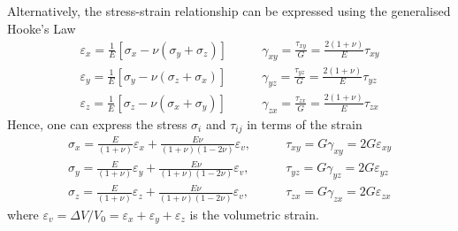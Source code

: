 \documentclass[12pt, a4paper]{article}
\numberwithin{equation}{section}
\begin{document}
Alternatively, the stress-strain relationship can be expressed using the generalised Hooke's Law
\begin{align}
    \varepsilon_x = \frac{1}{E} \left[ \sigma_x - \nu(\sigma_y + \sigma_z) \right]
    \quad & \quad
    \gamma_{xy} = \frac{\tau_{xy}}{G} = \frac{2(1+\nu)}{E} \tau_{xy} \\
    \varepsilon_y = \frac{1}{E} \left[ \sigma_y - \nu(\sigma_z + \sigma_x) \right]
    \quad & \quad
    \gamma_{yz} = \frac{\tau_{yz}}{G} = \frac{2(1+\nu)}{E} \tau_{yz} \\
    \varepsilon_z = \frac{1}{E} \left[ \sigma_z - \nu(\sigma_x + \sigma_y) \right]
    \quad & \quad
    \gamma_{zx} = \frac{\tau_{zx}}{G} = \frac{2(1+\nu)}{E} \tau_{zx}
\end{align}
Hence, one can express the stress $\sigma_i$ and $\tau_{ij}$ in terms of the strain
\begin{align}
\label{eqn:stress-strain_x}
    \sigma_x = \frac{E}{(1+\nu)} \varepsilon_x + \frac{E \nu}{(1+\nu) (1-2\nu)} \varepsilon_v,
    \quad & \quad
    \tau_{xy} = G \gamma_{xy} = 2G \varepsilon_{xy} \\
\label{eqn:stress-strain_y}
    \sigma_y = \frac{E}{(1+\nu)} \varepsilon_y + \frac{E \nu}{(1+\nu) (1-2\nu)} \varepsilon_v,
    \quad & \quad
    \tau_{yz} = G \gamma_{yz} = 2G \varepsilon_{yz} \\
\label{eqn:stress-strain_z}
    \sigma_z = \frac{E}{(1+\nu)} \varepsilon_z + \frac{E \nu}{(1+\nu) (1-2\nu)} \varepsilon_v,
    \quad & \quad
    \tau_{zx} = G \gamma_{zx} = 2G \varepsilon_{zx} 
\end{align}
where $\varepsilon_v = \Delta V/V_0 = \varepsilon_x + \varepsilon_y + \varepsilon_z$ is the volumetric strain. \\
\end{document}
